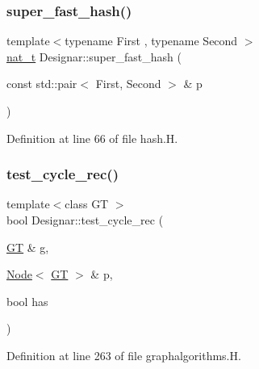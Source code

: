 \subsubsection{\texorpdfstring{super\+\_\+fast\+\_\+hash()}{super\_fast\_hash()}\hspace{0.1cm}{\footnotesize\ttfamily [5/5]}}
{\footnotesize\ttfamily template$<$typename First , typename Second $>$ \\
\hyperlink{namespace_designar_aa72662848b9f4815e7bf31a7cf3e33d1}{nat\+\_\+t} Designar\+::super\+\_\+fast\+\_\+hash (\begin{DoxyParamCaption}\item[{const std\+::pair$<$ First, Second $>$ \&}]{p }\end{DoxyParamCaption})\hspace{0.3cm}{\ttfamily [inline]}}



Definition at line 66 of file hash.\+H.

\mbox{\label{namespace_designar_a1d3028c78c40ec397096fb112f34eb78}} 
\subsubsection{\texorpdfstring{test\+\_\+cycle\+\_\+rec()}{test\_cycle\_rec()}}
{\footnotesize\ttfamily template$<$class GT $>$ \\
bool Designar\+::test\+\_\+cycle\+\_\+rec (\begin{DoxyParamCaption}\item[{\hyperlink{demo-buildgraph_8_c_a3001c40d2c31ca87ed96cd7d1334a55e}{GT} \&}]{g,  }\item[{\hyperlink{namespace_designar_a5af326c65aa2bd26b26c410f2030d09e}{Node}$<$ \hyperlink{demo-buildgraph_8_c_a3001c40d2c31ca87ed96cd7d1334a55e}{GT} $>$ \&}]{p,  }\item[{bool}]{has }\end{DoxyParamCaption})}



Definition at line 263 of file graphalgorithms.\+H.

\mbox{\label{namespace_designar_a29b53c8e7dfb33209e0a79ad167b6803}} 
